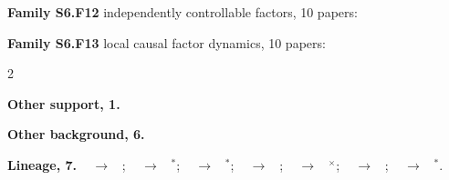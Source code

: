 \documentclass[10pt]{article}
\newcommand{\memb}[1]{\par\smallskip\textbf{#1}\quad}
\begin{document}
\memb{Family S6.F12} independently controllable factors, 10 papers: {\footnotesize \citetext{\citealp{Kooi-disentangled23}; \citealp{Thomas-independently17}; \citealp{Bengio-independently17}; \citealp{Sawada-disentangling18}; \citealp{Yang-towards18}; \citealp{Zadaianchuk-selfsupervised21}; \citealp{Dunion-conditional23}; \citealp{ColacoCarr-focused25}; \citealp{Rodriguez-Sanchez-pixels25}; \citealp{Liu-discovering26}}}

\memb{Family S6.F13} local causal factor dynamics, 10 papers: {\footnotesize \citetext{\citealp{Wang-causal22}; \citealp{Pitis-counterfactual20}; \citealp{Chuck-automated24}; \citealp{Hwang-discovery24}; \citealp{Hwang-finegrained24}; \citealp{Lei-spartan24}; \citealp{Urpi-causal24}; \citealp{Wang-skild24}; \citealp{Yang-towards24}; \citealp{Chuck-null25}}}

\begin{multicols}{2}
\memb{Other support, 1.} \citetext{\citealp{Everitt-understanding19}}

\memb{Other background, 6.} {\footnotesize \citetext{\citealp{Chitnis-learning19}; \citealp{Sancaktar-curious22}; \citealp{Zhou-rewardrelevance24}; \citealp{Kori-unifying26}; \citealp{Higgins-darla17}; \citealp{Ortiz-dmcvb24}}}

\end{multicols}
\memb{Lineage, 7.} {\footnotesize \citeauthor{Thomas-independently17}~\citeyear{Thomas-independently17} $\to$ \citeauthor{Kooi-disentangled23}~\citeyear{Kooi-disentangled23}; \citeauthor{Dietterich-discovering18}~\citeyear{Dietterich-discovering18} $\to$ \citeauthor{Efroni-provable22}~\citeyear{Efroni-provable22}$^\ast$; \citeauthor{Dietterich-discovering18}~\citeyear{Dietterich-discovering18} $\to$ \citeauthor{Wang-denoised22}~\citeyear{Wang-denoised22}$^\ast$; \citeauthor{Dietterich-discovering18}~\citeyear{Dietterich-discovering18} $\to$ \citeauthor{Trimponias-reinforcement23}~\citeyear{Trimponias-reinforcement23}; \citeauthor{Seitzer-causal21}~\citeyear{Seitzer-causal21} $\to$ \citeauthor{Urpi-causal24}~\citeyear{Urpi-causal24}$^\times$; \citeauthor{Kooi-disentangled23}~\citeyear{Kooi-disentangled23} $\to$ \citeauthor{Liu-discovering26}~\citeyear{Liu-discovering26}; \citeauthor{Wang-causal22}~\citeyear{Wang-causal22} $\to$ \citeauthor{Pendharkar-predictive26}~\citeyear{Pendharkar-predictive26}$^\ast$.}
\end{document}
